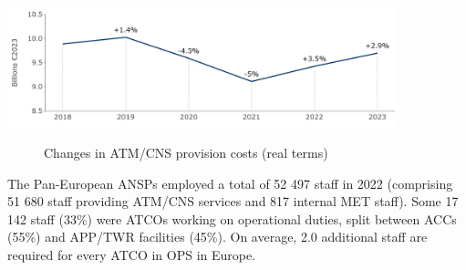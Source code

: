 \documentclass[
  letterpaper,
  DIV=11,
  numbers=noendperiod]{scrreprt}
\begin{document}
\includegraphics[width=0.85\textwidth,height=0.85\textheight]{figures/figure-2-5-1-hlsr_evo_cost.png}

\newpage{}

\begin{figure}


\caption{\label{fig-figure-2-5-2}Changes in ATM/CNS provision costs
(real terms)}

\end{figure}%

The Pan-European ANSPs employed a total of 52 497 staff in 2022
(comprising 51 680 staff providing ATM/CNS services and 817 internal MET
staff). Some 17 142 staff (33\%) were ATCOs working on operational
duties, split between ACCs (55\%) and APP/TWR facilities (45\%). On
average, 2.0 additional staff are required for every ATCO in OPS in
Europe.
\end{document}
